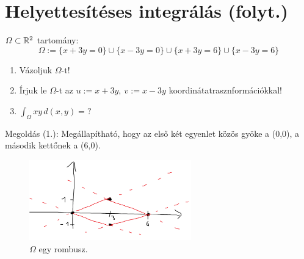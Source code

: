 \documentclass[a4paper,11.5pt]{article}
\begin{document}
	\section{Helyettesítéses integrálás (folyt.)}
	\begin{task}
		$ \varOmega\subset\mathbb{R}^2$ tartomány: 
		$$ \varOmega:=\{x+3y=0\}\cup\{x-3y=0\}\cup\{x+3y=6\}\cup\{x-3y=6\}$$
		\begin{enumerate}
			\item Vázoljuk $ \varOmega$-t!
			\item Írjuk le $ \varOmega$-t az $u:=x+3y,\ v:=x-3y$ koordinátatrasznformációkkal!
			\item $\int_ \varOmega xy\,d(x,y)=?$
		\end{enumerate}
		
		Megoldás (1.): Megállapítható, hogy az első két egyenlet közös gyöke a (0,0), a második kettőnek a (6,0).
		\begin{figure}[h]
			\centering
			\includegraphics[width=7cm]{kepek/01.png}
			\caption{$\varOmega$ egy rombusz.}
		\end{figure}
		

\end{task}
\end{document}
